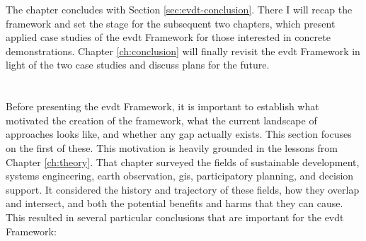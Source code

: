 The chapter concludes with Section \ref{sec:evdt-conclusion}. There I will recap the framework and set the stage for the subsequent two chapters, which present applied case studies of the \ac{evdt} Framework for those interested in concrete demonstrations. Chapter \ref{ch:conclusion} will finally revisit the \ac{evdt} Framework in light of the two case studies and discuss plans for the future. 

\section{} \label{sec:need}

Before presenting the \ac{evdt} Framework, it is important to establish what motivated the creation of the framework, what the current landscape of approaches looks like, and whether any gap actually exists. This section focuses on the first of these. This motivation is heavily grounded in the lessons from Chapter \ref{ch:theory}. That chapter surveyed the fields of sustainable development, systems engineering, earth observation, \ac{gis}, participatory planning, and decision support. It considered the history and trajectory of these fields, how they overlap and intersect, and both the potential benefits and harms that they can cause. This resulted in several particular conclusions that are important for the \ac{evdt} Framework:

